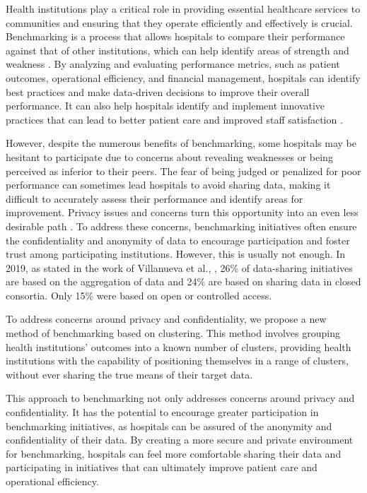 Health institutions play a critical role in providing essential healthcare services to communities and ensuring that they operate efficiently and effectively is crucial. Benchmarking is a process that allows hospitals to compare their performance against that of other institutions, which can help identify areas of strength and weakness \cite{suydamPatientSafetyData2007}. By analyzing and evaluating performance metrics, such as patient outcomes, operational efficiency, and financial management, hospitals can identify best practices and make data-driven decisions to improve their overall performance. It can also help hospitals identify and implement innovative practices that can lead to better patient care and improved staff satisfaction \cite{hulsenSharingCaringData2020}.

However, despite the numerous benefits of benchmarking, some hospitals may be hesitant to participate due to concerns about revealing weaknesses or being perceived as inferior to their peers. The fear of being judged or penalized for poor performance can sometimes lead hospitals to avoid sharing data, making it difficult to accurately assess their performance and identify areas for improvement. Privacy issues and concerns turn this opportunity into an even less desirable path \cite{hulsenSharingCaringData2020}. To address these concerns, benchmarking initiatives often ensure the confidentiality and anonymity of data to encourage participation and foster trust among participating institutions. However, this is usually not enough. In 2019, as stated in the work of Villanueva et al., \cite{villanuevaCharacterizingBiomedicalDataSharing2019}, 26\% of data-sharing initiatives are based on the aggregation of data and 24\% are based on sharing data in closed consortia. Only 15\% were based on open or controlled access.

To address concerns around privacy and confidentiality, we propose a new method of benchmarking based on clustering. This method involves grouping health institutions' outcomes into a known number of clusters, providing health institutions with the capability of positioning themselves in a range of clusters, without ever sharing the true means of their target data.

This approach to benchmarking not only addresses concerns around privacy and confidentiality. It has the potential to encourage greater participation in benchmarking initiatives, as hospitals can be assured of the anonymity and confidentiality of their data. By creating a more secure and private environment for benchmarking, hospitals can feel more comfortable sharing their data and participating in initiatives that can ultimately improve patient care and operational efficiency.

